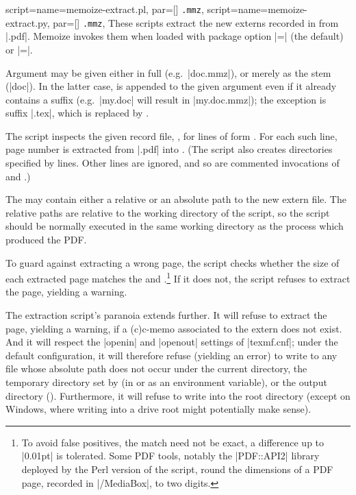 \documentclass[a4paper,11pt]{article}
\begin{document}
\begin{doc}{
    script={name=memoize-extract.pl, par=[] \texttt{.mmz}},
    script={name=memoize-extract.py, par=[] \texttt{.mmz}},
  }
  These scripts extract the new externs recorded in \dmmz from
  |.pdf|.  Memoize invokes them when loaded with package option
  |=| (the default) or
  |=|.

  Argument \dmmz may be given either in full (e.g.\ |doc.mmz|), or
  merely as the stem (|doc|).  In the latter case, \dmmz is appended to the
  given argument even if it already contains a suffix (e.g.\ |my.doc| will
  result in |my.doc.mmz|); the exception is suffix |.tex|, which is replaced by
  \dmmz.
  
  The script inspects the given record file, \dmmz, for lines of
  form .  For each such line, page number  is extracted from |.pdf| into .
  (The script also creates directories specified by  lines.
  Other lines are ignored, and so are commented invocations of
   and .)

  The  may contain either a relative or an absolute path
  to the new extern file.  The relative paths are relative to the working
  directory of the script, so the script should be normally executed in the
  same working directory as the  process which produced the PDF.

  To guard against extracting a wrong page, the script checks whether the size
  of each extracted page matches the  and .\footnote{\label{fn:tolerance}To avoid false positives, the match
    need not be exact, a difference up to |0.01pt| is tolerated.  Some PDF
    tools, notably the |PDF::API2| library deployed by the Perl version of the
    script, round the dimensions of a PDF page, recorded in |/MediaBox|, to two
    digits.}  If it does not, the script refuses to extract the page, yielding
  a warning.

  The extraction script's paranoia extends further.  It will refuse to extract
  the page, yielding a warning, if a (c)c-memo associated to the extern does
  not exist.  And it will respect the |openin| and |openout| settings of
  |texmf.cnf|; under the default configuration, it will therefore refuse
  (yielding an error) to write to any file whose absolute path does not occur
  under the current directory, the temporary directory set by
   (in  or as an environment variable),
  or the output directory ().  Furthermore, it
  will refuse to write into the root directory (except on Windows, where
  writing into a drive root might potentially make sense).


\end{doc}
\end{document}
